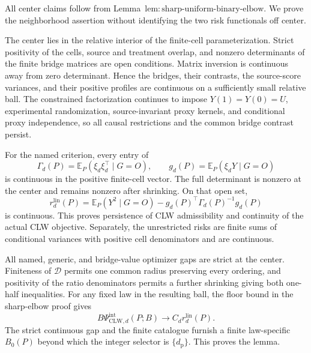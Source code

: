 All center claims follow from Lemma~\(\mathrm{lem{:}sharp\text{-}uniform\text{-}binary\text{-}elbow}\). We prove the neighborhood assertion without identifying the two risk functionals off center.

The center lies in the relative interior of the finite-cell parameterization. Strict positivity of the cells, source and treatment overlap, and nonzero determinants of the finite bridge matrices are open conditions. Matrix inversion is continuous away from zero determinant. Hence the bridges, their contrasts, the source-score variances, and their positive profiles are continuous on a sufficiently small relative ball. The constrained factorization continues to impose \(Y(1)=Y(0)=U\), experimental randomization, source-invariant proxy kernels, and conditional proxy independence, so all causal restrictions and the common bridge contrast persist.

For the named criterion, every entry of
\[
 \Gamma_d(P)=\mathbb E_P(\xi_d\xi_d^\top\mid G=O),
 \qquad g_d(P)=\mathbb E_P(\xi_dY\mid G=O)
\]
is continuous in the positive finite-cell vector. The full determinant is nonzero at the center and remains nonzero after shrinking. On that open set,
\[
 r_d^{\mathrm{lin}}(P)
 =\mathbb E_P(Y^2\mid G=O)
 -g_d(P)^\top\Gamma_d(P)^{-1}g_d(P)                       \tag{26}
\]
is continuous. This proves persistence of CLW admissibility and continuity of the actual CLW objective. Separately, the unrestricted risks are finite sums of conditional variances with positive cell denominators and are continuous.

All named, generic, and bridge-value optimizer gaps are strict at the center. Finiteness of \(\mathcal D\) permits one common radius preserving every ordering, and positivity of the ratio denominators permits a further shrinking giving both one-half inequalities. For any fixed law in the resulting ball, the floor bound in the sharp-elbow proof gives
\[
 B\Psi_{\mathrm{CLW},d}^{\mathrm{int}}(P;B)
 \longrightarrow C_dr_d^{\mathrm{lin}}(P).
\]
The strict continuous gap and the finite catalogue furnish a finite law-specific \(B_0(P)\) beyond which the integer selector is \(\{d_{\mathrm p}\}\). This proves the lemma.